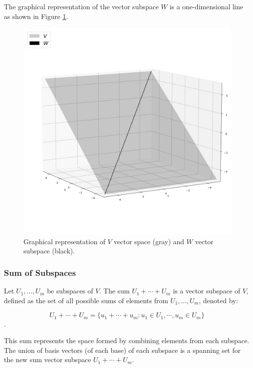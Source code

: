 The graphical representation of the vector subspace $W$ is a one-dimensional line as shown in Figure \ref{fig:vector-subspace-ex}.
\begin{figure}[h]
    \centering
    \includegraphics[scale=0.36]{Images/vector-subspace-ex.png}
    \caption{Graphical representation of $V$ vector space (gray) and $W$ vector subspace (black).}
    \label{fig:vector-subspace-ex}
\end{figure}

\subsubsection{Sum of Subspaces}

Let $U_1, \ldots, U_m$ be subspaces of $V$. The sum $U_1 + \cdots + U_m$ is a vector subspace of $V$, defined as the set of all possible sums of elements from $U_1, \ldots, U_m$, denoted by:

\[ U_1 + \cdots + U_m = \{ u_1 + \cdots + u_m : u_1 \in U_1, \cdots, u_m \in U_m \} \].

This sum represents the space formed by combining elements from each subspace. 
\\

The union of basis vectors (of each base) of each subspace is a spanning set for the new sum vector subspace $ U_1 + \cdots + U_m$.
\\

